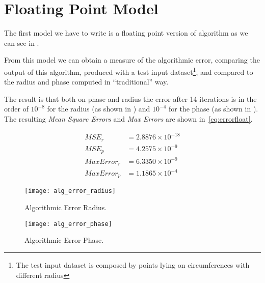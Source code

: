 \section{Floating Point Model}\label{sec:float}

The first model we have to write is a floating point version of \cordic{}
algorithm as we can see in .



From this model we can obtain a measure of the algorithmic error, comparing the
output of this algorithm, produced with a test input dataset\footnote{The test
input dataset is composed by points lying on circumferences with different
radius}, and compared to the radius and phase computed in ``traditional'' way.

The result is that both on phase and radius the error after 14 iterations is in
the order of \(10^{-8}\) for the radius (as shown in
) and \(10^{-4}\) for the phase (as shown in
). The resulting \emph{Mean Square Errors} and
\emph{Max Errors} are shown in~\eqref{eq:errorfloat}.

\begin{equation}\label{eq:errorfloat}
	\begin{array}{rl}
		MSE_r &= 2.8876\times10^{-18}\\
		MSE_p &= 4.2575\times10^{-9}\\
		MaxError_r &= 6.3350\times10^{-9}\\
		MaxError_p &= 1.1865\times10^{-4}
	\end{array}
\end{equation}

\begin{figure}[htb]
	\texttt{[image: alg\_error\_radius]}
	\caption{Algorithmic Error Radius.}\label{fig:floaterrorradius}
\end{figure}
\begin{figure}[htb]
	\texttt{[image: alg\_error\_phase]}
	\caption{Algorithmic Error Phase.}\label{fig:floaterrorphase}
\end{figure}
